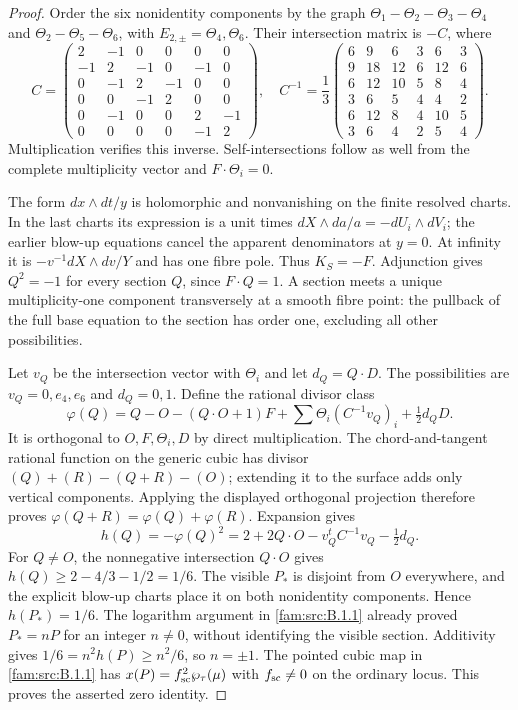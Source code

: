 \begin{proof}
Order the six nonidentity components by the graph
$\Theta_1-\Theta_2-\Theta_3-\Theta_4$ and $\Theta_2-\Theta_5-\Theta_6$, with $E_{2,\pm}=\Theta_4,\Theta_6$. Their intersection matrix is $-C$, where
\[
 C=\begin{pmatrix}2&-1&0&0&0&0\\-1&2&-1&0&-1&0\\0&-1&2&-1&0&0\\0&0&-1&2&0&0\\0&-1&0&0&2&-1\\0&0&0&0&-1&2\end{pmatrix},\quad
 C^{-1}=\frac13\begin{pmatrix}6&9&6&3&6&3\\9&18&12&6&12&6\\6&12&10&5&8&4\\3&6&5&4&4&2\\6&12&8&4&10&5\\3&6&4&2&5&4\end{pmatrix}.
\]
Multiplication verifies this inverse. Self-intersections follow as well from the complete multiplicity vector and $F\cdot\Theta_i=0$.

The form $dx\wedge dt/y$ is holomorphic and nonvanishing on the finite resolved charts. In the last charts its expression is a unit times $dX\wedge da/a=-dU_i\wedge dV_i$; the earlier blow-up equations cancel the apparent denominators at $y=0$. At infinity it is $-v^{-1}dX\wedge dv/Y$ and has one fibre pole. Thus $K_S=-F$. Adjunction gives $Q^2=-1$ for every section $Q$, since $F\cdot Q=1$. A section meets a unique multiplicity-one component transversely at a smooth fibre point: the pullback of the full base equation to the section has order one, excluding all other possibilities.

Let $v_Q$ be the intersection vector with $\Theta_i$ and let $d_Q=Q\cdot D$. The possibilities are $v_Q=0,e_4,e_6$ and $d_Q=0,1$. Define the rational divisor class
\[
 \varphi(Q)=Q-O-(Q\cdot O+1)F+\sum\Theta_i(C^{-1}v_Q)_i+\tfrac12d_QD.
\]
It is orthogonal to $O,F,\Theta_i,D$ by direct multiplication. The chord-and-tangent rational function on the generic cubic has divisor $(Q)+(R)-(Q+R)-(O)$; extending it to the surface adds only vertical components. Applying the displayed orthogonal projection therefore proves $\varphi(Q+R)=\varphi(Q)+\varphi(R)$. Expansion gives
\[
 h(Q)=-\varphi(Q)^2=2+2Q\cdot O-v_Q^tC^{-1}v_Q-\tfrac12d_Q.
\]
For $Q\ne O$, the nonnegative intersection $Q\cdot O$ gives $h(Q)\ge2-4/3-1/2=1/6$. The visible $P_*$ is disjoint from $O$ everywhere, and the explicit blow-up charts place it on both nonidentity components. Hence $h(P_*)=1/6$. The logarithm argument in \ref{fam:src:B.1.1} already proved $P_*=nP$ for an integer $n\ne0$, without identifying the visible section. Additivity gives $1/6=n^2h(P)\ge n^2/6$, so $n=\pm1$. The pointed cubic map in \ref{fam:src:B.1.1} has $x(P)=f_{\rm sc}^2\wp_\tau(\mu)$ with $f_{\rm sc}\ne0$ on the ordinary locus. This proves the asserted zero identity.
\end{proof}

